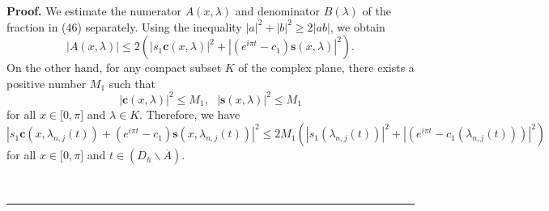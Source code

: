 \documentclass{article}%
\newenvironment{proof}[1][Proof]{\textbf{#1.} }{\ \rule{0.5em}{0.5em}}
\begin{document}
\begin{proof}
We estimate the numerator $A(x,\lambda)$ and denominator $B(\lambda)$ of the
fraction in (46) separately. Using the inequality $\left\vert a\right\vert
^{2}+\left\vert b\right\vert ^{2}\geq2\left\vert ab\right\vert $, we obtain
\[
\left\vert A(x,\lambda)\right\vert \leq2(\left\vert s_{1}\mathbf{c}%
(x,\lambda)\right\vert ^{2}+\left\vert \left(  e^{i\pi t}-c_{1}\right)
\mathbf{s}(x,\lambda)\right\vert ^{2}).
\]
On the other hand, for any compact subset $K$ of the complex plane, there
exists a positive number $M_{1}$ such that%
\[
\left\vert \mathbf{c}(x,\lambda)\right\vert ^{2}\leq M_{1},\text{ }\left\vert
\mathbf{s}(x,\lambda)\right\vert ^{2}\leq M_{1}%
\]
for all $x\in\lbrack0,\pi]$ and $\lambda\in K.$ Therefore, we have
\begin{equation}
\left\vert s_{1}\mathbf{c}(x,\lambda_{n,j}(t))+\left(  e^{i\pi t}%
-c_{1}\right)  \mathbf{s}(x,\lambda_{n,j}(t))\right\vert ^{2}\leq
2M_{1}(\left\vert s_{1}(\lambda_{n,j}(t))\right\vert ^{2}+\left\vert \left(
e^{i\pi t}-c_{1}(\lambda_{n,j}(t))\right)  \right\vert ^{2}) \tag{47}%
\end{equation}
for all $x\in\lbrack0,\pi]$ and $t\in\left(  D_{h}\backslash\overline
{A}\right)  .$


\end{proof}
\end{document}
